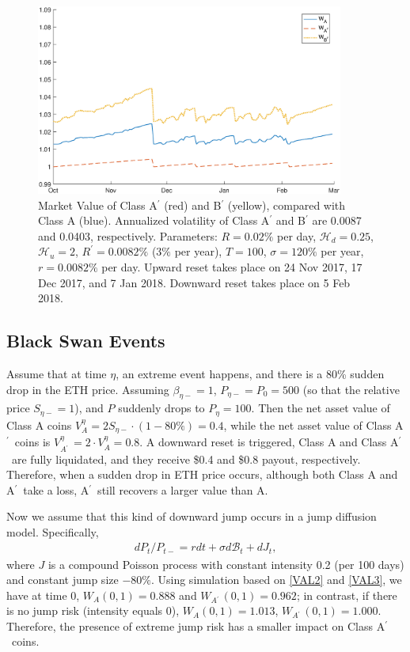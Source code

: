 \documentclass[11pt]{article}%
\numberwithin{equation}{section}
\theoremstyle{plain}
\newcommand{\Ap}{A\ensuremath{^\prime}~}
\begin{document}
\begin{figure}[!htb]
\centering
\includegraphics[width=0.9\textwidth]{WABpnoCI4.eps}
\caption{Market Value of Class A$^\prime$ (red) and B$^\prime$ (yellow), compared with Class A (blue). Annualized volatility of Class A$^\prime$ and B$^\prime$ are 0.0087 and 0.0403, respectively. Parameters: $R=0.02\%$ per day, $\mathcal{H}_{d}=0.25$, $\mathcal{H}_{u} =2$, $R^\prime = 0.0082\%$ ($3\%$ per year), $T=100$, $\sigma= 120\%$ per year, $r=0.0082\%$ per day. Upward reset takes place on 24 Nov 2017, 17 Dec 2017, and 7 Jan 2018. Downward reset takes place on 5 Feb 2018.}
\label{fig:valAPrime}
\end{figure}



\subsection{Black Swan Events}
Assume that at time $\eta$, an extreme event happens, and there is a 80\% sudden drop in the ETH price. Assuming $\beta_{\eta-} = 1$, $P_{\eta-} = P_0 = 500$ (so that the relative price $S_{\eta-} = 1$), and $P$ suddenly drops to $P_\eta = 100$. Then the net asset value of Class A coins $V_A^\eta = 2S_{\eta-} \cdot(1-80\%) = 0.4$, while the net asset value of Class \Ap coins is $V^\eta_{\Ap} = 2 \cdot V^\eta_A = 0.8$. A downward reset is triggered, Class A and Class \Ap are fully liquidated, and they receive \$0.4 and \$0.8 payout, respectively. Therefore, when a sudden drop in ETH price occurs, although both Class A and \Ap take a loss, \Ap still recovers a larger value than A.

Now we assume that this kind of downward jump occurs in a jump diffusion model. Specifically,
\begin{align*}
dP_{t}/P_{t-}=r dt+\sigma d\mathcal{B}_{t}+ dJ_t,
\end{align*}
where $J$ is a compound Poisson process with constant intensity 0.2 (per 100 days) and constant jump size $-80\%$. Using simulation based on \eqref{VAL2} and \eqref{VAL3}, we have at time 0, $W_A(0,1) = 0.888$ and $W_{\Ap} (0,1) = 0.962$; in contrast, if there is no jump risk (intensity equals 0), $W_A(0,1) = 1.013$, $W_{\Ap} (0,1) = 1.000$. Therefore, the presence of extreme jump risk has a smaller impact on Class \Ap coins.
\end{document}
